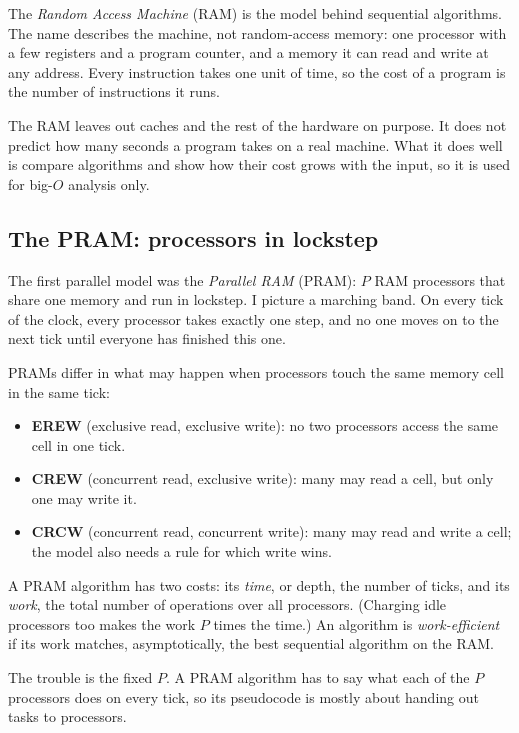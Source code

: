 The \emph{Random Access Machine} (RAM) is the model behind sequential algorithms. The name describes the machine, not random-access memory: one processor with a few registers and a program counter, and a memory it can read and write at any address. Every instruction takes one unit of time, so the cost of a program is the number of instructions it runs.

The RAM leaves out caches and the rest of the hardware on purpose. It does not predict how many seconds a program takes on a real machine. What it does well is compare algorithms and show how their cost grows with the input, so it is used for big-$O$ analysis only.

\subsection{The PRAM: processors in lockstep}

The first parallel model was the \emph{Parallel RAM} (PRAM): $P$ RAM processors that share one memory and run in lockstep. I picture a marching band. On every tick of the clock, every processor takes exactly one step, and no one moves on to the next tick until everyone has finished this one.

PRAMs differ in what may happen when processors touch the same memory cell in the same tick:
\begin{itemize}
  \item \textbf{EREW} (exclusive read, exclusive write): no two processors access the same cell in one tick.
  \item \textbf{CREW} (concurrent read, exclusive write): many may read a cell, but only one may write it.
  \item \textbf{CRCW} (concurrent read, concurrent write): many may read and write a cell; the model also needs a rule for which write wins.
\end{itemize}

A PRAM algorithm has two costs: its \emph{time}, or depth, the number of ticks, and its \emph{work}, the total number of operations over all processors. (Charging idle processors too makes the work $P$ times the time.) An algorithm is \emph{work-efficient} if its work matches, asymptotically, the best sequential algorithm on the RAM.

The trouble is the fixed $P$. A PRAM algorithm has to say what each of the $P$ processors does on every tick, so its pseudocode is mostly about handing out tasks to processors.

